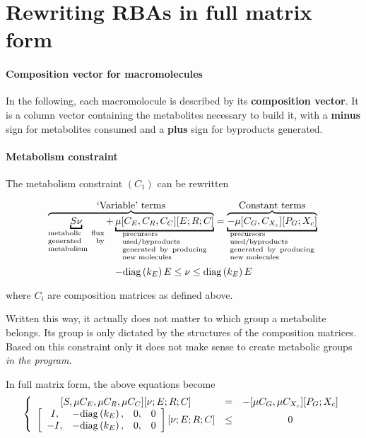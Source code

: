 \section{Rewriting RBAs in full matrix form}

\paragraph{Composition vector for macromolecules} In the following, each macromolocule is described by its \textbf{composition vector}. It is a column vector containing the metabolites necessary to build it, with a \textbf{minus} sign for metabolites consumed and a \textbf{plus} sign for byproducts generated.

\paragraph{Metabolism constraint} The metabolism constraint $(C_1)$ can be rewritten

\[
\overbrace
{
\underbracket{S\nu}_{\parbox{2cm}{\scriptsize metabolic flux generated by metabolism}} 
+
\underbracket{\mu [C_E,C_R,C_C] [E;R;C]}_{\parbox{3cm}{\scriptsize precursors used/byproducts generated by producing new molecules}}
}^{\text{\normalsize `Variable' terms}}
=
\overbrace
{
\underbracket{-\mu [C_{G},C_{X_c}] [P_G;X_c]}_{\parbox{3cm}{\scriptsize precursors used/byproducts generated by producing new molecules}}
}^{\text{\normalsize Constant terms}} \\
\]
\[
-\mathrm{diag}\left(k_E\right) E \leq \nu \leq \mathrm{diag}\left(k_E\right) E
\]

where $C_{i}$ are composition matrices as defined above.

Written this way, it actually does not matter to which group a metabolite belongs. Its group is only dictated by the structures of the composition matrices. Based on this constraint only it does not make sense to create metabolic groups \emph{in the program}.

In full matrix form, the above equations become
\[
\left\{
\begin{array}{ccc}
  [S, \mu C_E, \mu C_R, \mu C_C][\nu;E;R;C]
  & = & - [\mu C_G,\mu C_{X_c}][P_G;X_c] \\
  \left[
    \begin{array}{cccc}
      I, & -\mathrm{diag}\left(k_E\right), & 0, & 0 \\
      -I, & -\mathrm{diag}\left(k_E\right), & 0, & 0
    \end{array}
    \right]
       [\nu; E;R;C] &\leq & 0
\end{array}
\right.
\]

